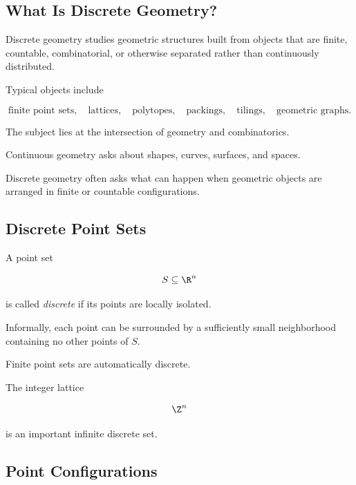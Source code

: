 \subsection{What Is Discrete Geometry?}
\label{subsec:what-is-discrete-geometry}

Discrete geometry studies geometric structures built from objects that are
finite, countable, combinatorial, or otherwise separated rather than
continuously distributed.

Typical objects include

\[
\boxed{
\text{finite point sets},
\quad
\text{lattices},
\quad
\text{polytopes},
\quad
\text{packings},
\quad
\text{tilings},
\quad
\text{geometric graphs}.
}
\]

The subject lies at the intersection of geometry and combinatorics.

\begin{conceptbox}
Continuous geometry asks about shapes, curves, surfaces, and spaces.

Discrete geometry often asks what can happen when geometric objects are
arranged in finite or countable configurations.
\end{conceptbox}

\subsection{Discrete Point Sets}
\label{subsec:discrete-point-sets}

A point set

\[
S\subseteq\R^n
\]

is called \emph{discrete} if its points are locally isolated.

Informally, each point can be surrounded by a sufficiently small
neighborhood containing no other points of \(S\).

Finite point sets are automatically discrete.

The integer lattice

\[
\Z^n
\]

is an important infinite discrete set.

\subsection{Point Configurations}
\label{subsec:point-configurations}

